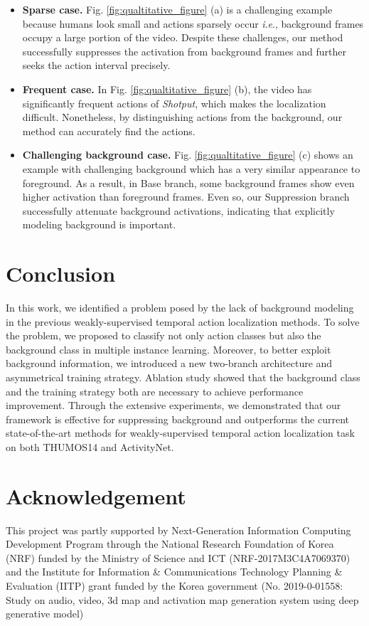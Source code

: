 \documentclass[letterpaper]{article} %
\newcommand{\ie}{\textit{i}.\textit{e}.}
\newcommand{\Fref}[1]{Fig. \ref{#1}}
\begin{document}
\begin{itemize}
    \item \textbf{Sparse case.} \Fref{fig:qualtitative_figure} (a) is a challenging example because humans look small and actions sparsely occur \ie, background frames occupy a large portion of the video. Despite these challenges, our method successfully suppresses the activation from background frames and further seeks the action interval precisely.
    \item \textbf{Frequent case.} In \Fref{fig:qualtitative_figure} (b), the video has significantly frequent actions of \textit{Shotput}, which makes the localization difficult. Nonetheless, by distinguishing actions from the background, our method can accurately find the actions.
    \item \textbf{Challenging background case.} \Fref{fig:qualtitative_figure} (c) shows an example with challenging background which has a very similar appearance to foreground. As a result, in Base branch, some background frames show even higher activation than foreground frames. Even so, our Suppression branch successfully attenuate background activations, indicating that explicitly modeling background is important.
\end{itemize}

\section{Conclusion}

In this work, we identified a problem posed by the lack of background modeling in the previous weakly-supervised temporal action localization methods. To solve the problem, we proposed to classify not only action classes but also the background class in multiple instance learning.
Moreover,
to better exploit background information, we introduced a new two-branch architecture and asymmetrical training strategy.
Ablation study showed that the background class and the training strategy both are necessary to achieve performance improvement.
Through the extensive experiments, we demonstrated that our framework is effective for suppressing background and outperforms the current state-of-the-art methods for weakly-supervised temporal action localization task on both THUMOS14 and ActivityNet.

\section{Acknowledgement}
{\small
This project was partly supported by Next-Generation Information Computing Development Program through the National Research Foundation of Korea (NRF) funded by the Ministry of Science and ICT (NRF-2017M3C4A7069370) and the Institute for Information \& Communications Technology Planning \& Evaluation (IITP) grant funded by the Korea government (No. 2019-0-01558: Study on audio, video, 3d map and activation map generation system using deep generative model)
}

{
\fontsize{9pt}{10pt} \selectfont


}
\end{document}
